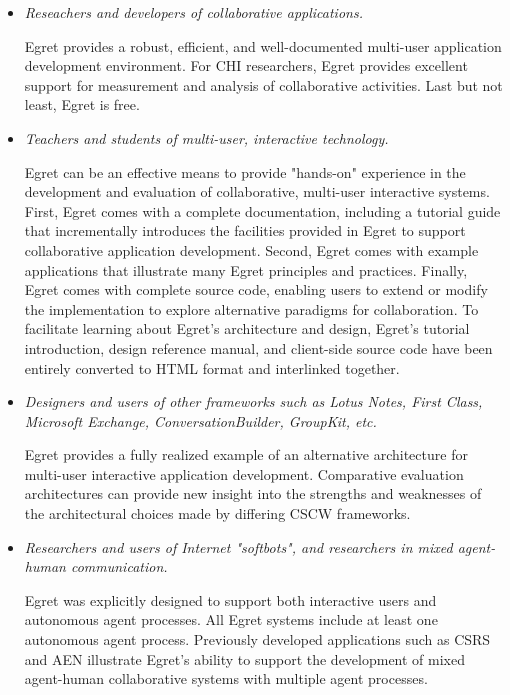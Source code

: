\begin{itemize}
\item {\em Reseachers and developers of collaborative applications.}

  Egret provides a robust, efficient, and well-documented multi-user
  application development environment.  For CHI researchers, Egret
  provides excellent support for measurement and analysis of
  collaborative activities.  Last but not least, Egret is free.

\item {\em Teachers and students of multi-user, interactive technology.}

  Egret can be an effective means to provide "hands-on" experience in the
  development and evaluation of collaborative, multi-user interactive
  systems.  First, Egret comes with a complete documentation, including a
  tutorial guide that incrementally introduces the facilities provided in
  Egret to support collaborative application development.  Second, Egret
  comes with example applications that illustrate many Egret principles and
  practices.  Finally, Egret comes with complete source code, enabling
  users to extend or modify the implementation to explore alternative
  paradigms for collaboration. To facilitate learning about Egret's
  architecture and design, Egret's tutorial introduction, design
  reference manual, and client-side source code have been entirely
  converted to HTML format and interlinked together.

\item {\em Designers and users of other frameworks such as Lotus Notes,
  First Class, Microsoft Exchange, ConversationBuilder, GroupKit, etc. }

  Egret provides a fully realized example of an alternative architecture
  for multi-user interactive application development. Comparative
  evaluation architectures can provide new insight into the strengths and
  weaknesses of the architectural choices made by differing CSCW
  frameworks.

\item {\em Researchers and users of Internet "softbots", and researchers
  in mixed agent-human communication.}

  Egret was explicitly designed to support both interactive users and
  autonomous agent processes.  All Egret systems include at least one
  autonomous agent process.  Previously developed applications such
  as CSRS and AEN illustrate Egret's ability to support the
  development of mixed agent-human collaborative systems with
  multiple agent processes.

\end{itemize}




